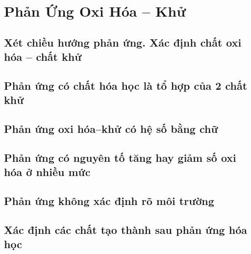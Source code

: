 \documentclass{article}
\numberwithin{equation}{section}
\begin{document}

\section{Phản Ứng Oxi Hóa -- Khử}

\subsection{Xét chiều hướng phản ứng. Xác định chất oxi hóa -- chất khử}


\subsection{Phản ứng có chất hóa học là tổ hợp của 2 chất khử}


\subsection{Phản ứng oxi hóa--khử có hệ số bằng chữ}


\subsection{Phản ứng có nguyên tố tăng hay giảm số oxi hóa ở nhiều mức}


\subsection{Phản ứng không xác định rõ môi trường}


\subsection{Xác định các chất tạo thành sau phản ứng hóa học}

\end{document}

